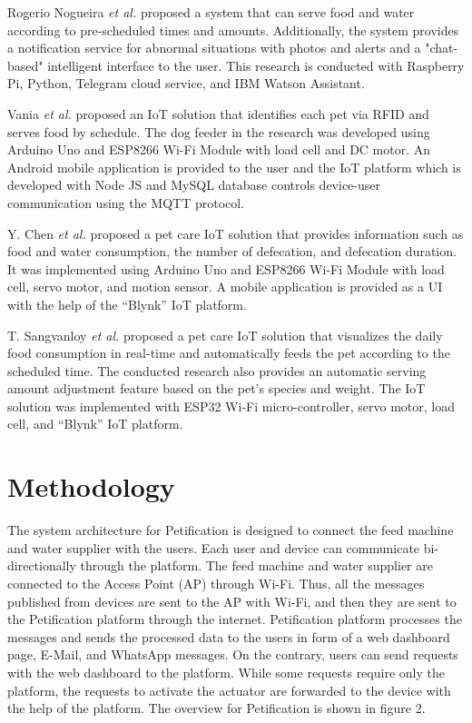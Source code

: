 \documentclass[conference]{IEEEtran}
\begin{document}
Rogerio Nogueira \textit{et al.} \cite{b11} proposed a system that can serve food and water according to pre-scheduled times and amounts.
Additionally, the system provides a notification service for abnormal situations with photos and alerts and a "chat-based" intelligent interface to the user.
This research is conducted with Raspberry Pi, Python, Telegram cloud service, and IBM Watson Assistant.

Vania \textit{et al.} \cite{b12} proposed an IoT solution that identifies each pet via RFID and serves food by schedule.
The dog feeder in the research was developed using Arduino Uno and ESP8266 Wi-Fi Module with load cell and DC motor.
An Android mobile application is provided to the user and the IoT platform which is developed with Node JS and MySQL database controls device-user communication using the MQTT protocol.

Y. Chen \textit{et al.} \cite{b5} proposed a pet care IoT solution that provides information such as food and water consumption, the number of defecation, and defecation duration.
It was implemented using Arduino Uno and ESP8266 Wi-Fi Module with load cell, servo motor, and motion sensor.
A mobile application is provided as a UI with the help of the “Blynk” IoT platform.

T. Sangvanloy \textit{et al.} \cite{b4} proposed a pet care IoT solution that visualizes the daily food consumption in real-time and automatically feeds the pet according to the scheduled time.
The conducted research also provides an automatic serving amount adjustment feature based on the pet's species and weight.
The IoT solution was implemented with ESP32 Wi-Fi micro-controller, servo motor, load cell, and “Blynk” IoT platform.

\section{Methodology}
The system architecture for Petification is designed to connect the feed machine and water supplier with the users.
Each user and device can communicate bi-directionally through the platform.
The feed machine and water supplier are connected to the Access Point (AP) through Wi-Fi.
Thus, all the messages published from devices are sent to the AP with Wi-Fi, and then they are sent to the Petification platform through the internet.
Petification platform processes the messages and sends the processed data to the users in form of a web dashboard page, E-Mail, and WhatsApp messages.
On the contrary, users can send requests with the web dashboard to the platform.
While some requests require only the platform, the requests to activate the actuator are forwarded to the device with the help of the platform.
The overview for Petification is shown in figure 2.
\end{document}
